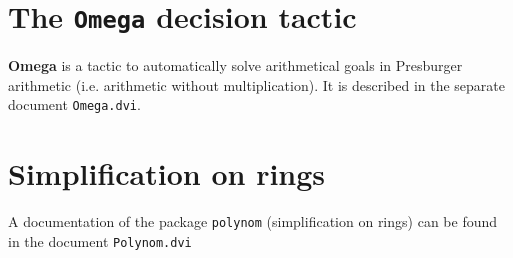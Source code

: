 \section[The {\tt Omega} decision tactic]{The {\tt Omega} decision tactic\label{Addoc-omega}}
{\bf Omega} is a tactic to automatically solve arithmetical goals in
Presburger arithmetic (i.e. arithmetic without multiplication). 
It is described in the separate document {\tt Omega.dvi}.

\section[Simplification on rings]{Simplification on rings\label{Addoc-polynom}}
A documentation of the package {\tt polynom} (simplification on rings)
can be found in the document {\tt Polynom.dvi}



